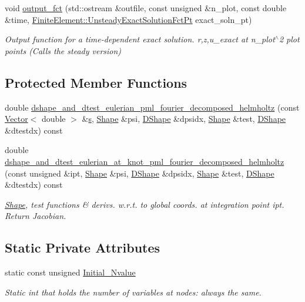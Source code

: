 \begin{DoxyCompactItemize}
void \hyperlink{classoomph_1_1QPMLFourierDecomposedHelmholtzElement_a7fa77af72f24908212f80b3fa1519441}{output\+\_\+fct} (std\+::ostream \&outfile, const unsigned \&n\+\_\+plot, const double \&time, \hyperlink{classoomph_1_1FiniteElement_ad4ecf2b61b158a4b4d351a60d23c633e}{Finite\+Element\+::\+Unsteady\+Exact\+Solution\+Fct\+Pt} exact\+\_\+soln\+\_\+pt)
\begin{DoxyCompactList}\small\item\em Output function for a time-\/dependent exact solution. r,z,u\+\_\+exact at n\+\_\+plot$^\wedge$2 plot points (Calls the steady version) \end{DoxyCompactList}\end{DoxyCompactItemize}
\subsection*{Protected Member Functions}
\begin{DoxyCompactItemize}
\item 
double \hyperlink{classoomph_1_1QPMLFourierDecomposedHelmholtzElement_adb66973c00aa3b1b367fdd890e4dfd68}{dshape\+\_\+and\+\_\+dtest\+\_\+eulerian\+\_\+pml\+\_\+fourier\+\_\+decomposed\+\_\+helmholtz} (const \hyperlink{classoomph_1_1Vector}{Vector}$<$ double $>$ \&\hyperlink{cfortran_8h_ab7123126e4885ef647dd9c6e3807a21c}{s}, \hyperlink{classoomph_1_1Shape}{Shape} \&psi, \hyperlink{classoomph_1_1DShape}{D\+Shape} \&dpsidx, \hyperlink{classoomph_1_1Shape}{Shape} \&test, \hyperlink{classoomph_1_1DShape}{D\+Shape} \&dtestdx) const
\item 
double \hyperlink{classoomph_1_1QPMLFourierDecomposedHelmholtzElement_a40b27cbfd852c4b678596070d1dd2d8b}{dshape\+\_\+and\+\_\+dtest\+\_\+eulerian\+\_\+at\+\_\+knot\+\_\+pml\+\_\+fourier\+\_\+decomposed\+\_\+helmholtz} (const unsigned \&ipt, \hyperlink{classoomph_1_1Shape}{Shape} \&psi, \hyperlink{classoomph_1_1DShape}{D\+Shape} \&dpsidx, \hyperlink{classoomph_1_1Shape}{Shape} \&test, \hyperlink{classoomph_1_1DShape}{D\+Shape} \&dtestdx) const
\begin{DoxyCompactList}\small\item\em \hyperlink{classoomph_1_1Shape}{Shape}, test functions \& derivs. w.\+r.\+t. to global coords. at integration point ipt. Return Jacobian. \end{DoxyCompactList}\end{DoxyCompactItemize}
\subsection*{Static Private Attributes}
\begin{DoxyCompactItemize}
\item 
static const unsigned \hyperlink{classoomph_1_1QPMLFourierDecomposedHelmholtzElement_a42902864b05d224d4d640739a418ca97}{Initial\+\_\+\+Nvalue}
\begin{DoxyCompactList}\small\item\em Static int that holds the number of variables at nodes\+: always the same. \end{DoxyCompactList}\end{DoxyCompactItemize}
